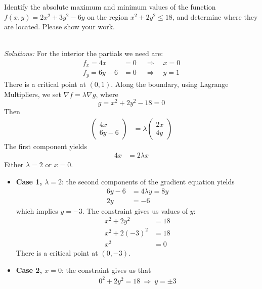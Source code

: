 \fi




 
\ifnum {}
\question[6] Identify the absolute maximum and minimum values of the function $f(x,y) = 2x^2 + 3y^2 - 6y$ on the region $x^2+2y^2 \le 18$, and determine where they are located. Please show your work. 
\ifnum {} {\color{DarkBlue} \\ \textit{Solutions:} For the interior the partials we need are: 
\begin{align*}
    f_x = 4x &=0 \ \quad \Rightarrow \quad x= 0 \\
    f_y = 6y -6 &=0 \ \quad \Rightarrow \quad y= 1 
\end{align*}
There is a critical point at $(0,1)$. Along the boundary, using Lagrange Multipliers, we set $\nabla f = \lambda \nabla g$, where $$g = x^2 + 2y^2 - 18 = 0$$  Then
\begin{align}
        \begin{pmatrix} 4x \\ 6y-6 \end{pmatrix} 
        &= \lambda \begin{pmatrix} 2x\\4y \end{pmatrix} 
    \end{align}
    The first component yields
    \begin{align}
        4x &= 2\lambda x
    \end{align}
    Either $\lambda =2$ or $x=0$. 
    \begin{itemize}
        \item \textbf{Case 1, $\lambda =2$}: the second components of the gradient equation yields
        \begin{align}
            6y-6 &= 4\lambda y = 8y\\
            2y &= -6
        \end{align} which implies $y = -3$. The constraint gives us values of $y$: 
        \begin{align}
            x^2 + 2y^2 &= 18 \\ 
            x^2 + 2(-3)^2 &= 18 \\ 
            x^2 &= 0
        \end{align}
        There is a critical point at $(0,-3)$.
        \item \textbf{Case 2, $x=0$}: the constraint gives us that 
        \begin{align}
            0^2+2y^2 = 18 \ \Rightarrow \ y = \pm 3

\end{align}
\end{itemize}}
